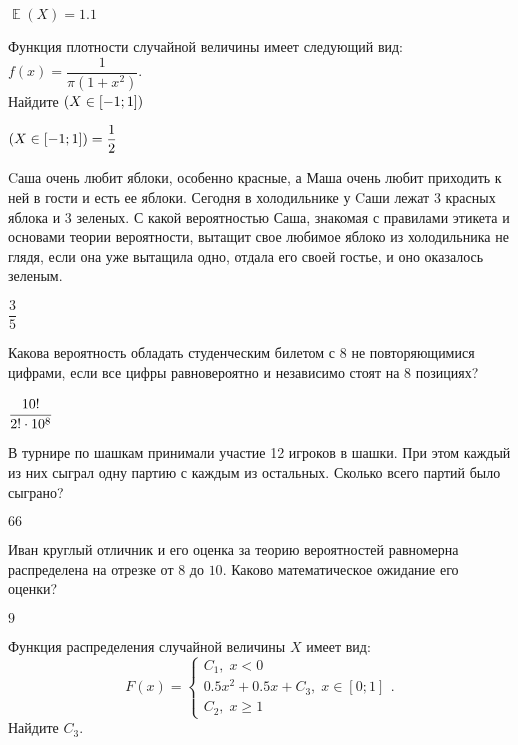 \documentclass[12pt, addpoints, answers]{exam} %
\DeclareMathOperator{\E}{\mathbb{E}}
\let\P\relax
\DeclareMathOperator{\P}{\mathbb{P}}
\begin{document}
\begin{questions}
\begin{solution}
 $\E(X)=1.1$
\end{solution}



\question Функция плотности случайной величины имеет следующий вид: $f(x)=\dfrac{1}{\pi(1+x^2)}$.\\ Найдите $\P(X\in[-1;1])$


\begin{solution}
 $\P(X\in[-1;1])=\dfrac12$
\end{solution}

\question Cаша очень любит яблоки, особенно красные, а Маша очень любит приходить к ней в гости и есть ее яблоки. Сегодня в холодильнике у Cаши лежат $3$ красных яблока и $3$ зеленых. С какой вероятностью Саша, знакомая с правилами этикета и основами теории вероятности, вытащит свое любимое яблоко из холодильника не глядя, если она уже вытащила одно, отдала его своей гостье, и оно оказалось зеленым.

\begin{solution}
 $\dfrac35$
\end{solution}

\question Какова вероятность обладать студенческим билетом с 8 не повторяющимися цифрами, если все цифры равновероятно и независимо стоят на 8 позициях?

\begin{solution}
 $\cfrac{10!}{2! \cdot 10^8}$
\end{solution}

\question В турнире по шашкам принимали участие 12 игроков в шашки. При этом каждый из них сыграл одну партию с каждым из остальных. Сколько всего партий было сыграно?

\begin{solution}
 $66$
\end{solution}



\question Иван круглый отличник и его оценка за теорию вероятностей равномерна распределена на отрезке от $8$ до $10$. Каково математическое ожидание его оценки?

\begin{solution}
 $9$ 
\end{solution}

\question Функция распределения случайной величины $X$ имеет вид:
\[
F(x)=\begin{cases}
C_1, \; x< 0 \\
0.5 x^2+ 0.5x+ C_3, \; x \in [0;1] \\
C_2, \; x \geq 1
\end{cases}.
\]
Найдите  $C_3$.


\end{questions}
\end{document}
